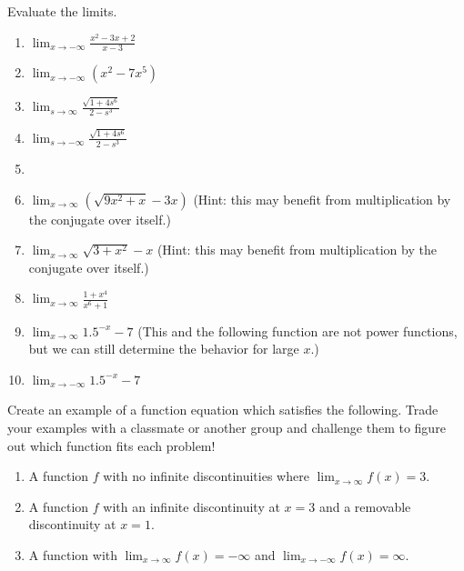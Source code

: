 \documentclass{ximera}
\begin{document}
\begin{exercise}
    Evaluate the limits.\\
  \begin{enumerate}
    \item $\displaystyle\lim_{x\rightarrow -\infty}\frac{x^2-3x+2}{x-3}$
    
    \item $\displaystyle\lim_{x\rightarrow -\infty} (x^2-7x^5)$
    
    \item $\displaystyle\lim_{s\rightarrow \infty}\frac{\sqrt{1+4s^6}}{2-s^3}$
    
    \item $\displaystyle\lim_{s\rightarrow -\infty}\frac{\sqrt{1+4s^6}}{2-s^3}$
    \item 
    \item $\displaystyle\lim_{x\rightarrow \infty}(\sqrt{9x^2+x}-3x)$ (Hint: this may benefit from multiplication by the conjugate over itself.)
    
    \item $\displaystyle \lim_{x\rightarrow \infty} \sqrt{3+x^2}-x$ (Hint: this may benefit from multiplication by the conjugate over itself.)

    \item $\displaystyle\lim_{x\rightarrow \infty}\frac{1+x^4}{x^6+1}$
    
    \item $\displaystyle \lim_{x\rightarrow \infty} 1.5^{-x}-7$ (This and the following function are not power functions, but we can still determine the behavior for large $x$.)
    
    \item $\displaystyle \lim_{x\rightarrow -\infty} 1.5^{-x}-7$
    
  \end{enumerate}
\end{exercise} 

    

\begin{exercise}
    

 Create an example of a function equation which satisfies the following.  Trade your examples with a classmate or another group and challenge them to figure out which function fits each problem! 
 \begin{enumerate}
    \item A function $f$ with no infinite discontinuities where $\displaystyle\lim_{x\rightarrow \infty}f(x)=3$. \\
    
    \item A function $f$ with an infinite discontinuity at $x=3$ and a removable discontinuity at $x=1$.\\
    
    \item A function with $\displaystyle\lim_{x\rightarrow \infty}f(x)=-\infty$ and $\displaystyle\lim_{x\rightarrow -\infty}f(x)=\infty$.\\
 \end{enumerate}

\end{exercise}
\end{document}
